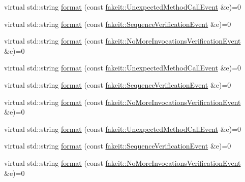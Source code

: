 \begin{DoxyCompactItemize}
\item 
virtual std\+::string \mbox{\hyperlink{structfakeit_1_1EventFormatter_a103815eedb0a69ce7e3565270686bf7b}{format}} (const \mbox{\hyperlink{structfakeit_1_1UnexpectedMethodCallEvent}{fakeit\+::\+Unexpected\+Method\+Call\+Event}} \&e)=0
\item 
virtual std\+::string \mbox{\hyperlink{structfakeit_1_1EventFormatter_a9776a0cb30ddb959b49e1a95ef560946}{format}} (const \mbox{\hyperlink{structfakeit_1_1SequenceVerificationEvent}{fakeit\+::\+Sequence\+Verification\+Event}} \&e)=0
\item 
virtual std\+::string \mbox{\hyperlink{structfakeit_1_1EventFormatter_a2c620c0b788a1c14e8f5ac40dd57d7ad}{format}} (const \mbox{\hyperlink{structfakeit_1_1NoMoreInvocationsVerificationEvent}{fakeit\+::\+No\+More\+Invocations\+Verification\+Event}} \&e)=0
\item 
virtual std\+::string \mbox{\hyperlink{structfakeit_1_1EventFormatter_a103815eedb0a69ce7e3565270686bf7b}{format}} (const \mbox{\hyperlink{structfakeit_1_1UnexpectedMethodCallEvent}{fakeit\+::\+Unexpected\+Method\+Call\+Event}} \&e)=0
\item 
virtual std\+::string \mbox{\hyperlink{structfakeit_1_1EventFormatter_a9776a0cb30ddb959b49e1a95ef560946}{format}} (const \mbox{\hyperlink{structfakeit_1_1SequenceVerificationEvent}{fakeit\+::\+Sequence\+Verification\+Event}} \&e)=0
\item 
virtual std\+::string \mbox{\hyperlink{structfakeit_1_1EventFormatter_a2c620c0b788a1c14e8f5ac40dd57d7ad}{format}} (const \mbox{\hyperlink{structfakeit_1_1NoMoreInvocationsVerificationEvent}{fakeit\+::\+No\+More\+Invocations\+Verification\+Event}} \&e)=0
\item 
virtual std\+::string \mbox{\hyperlink{structfakeit_1_1EventFormatter_a103815eedb0a69ce7e3565270686bf7b}{format}} (const \mbox{\hyperlink{structfakeit_1_1UnexpectedMethodCallEvent}{fakeit\+::\+Unexpected\+Method\+Call\+Event}} \&e)=0
\item 
virtual std\+::string \mbox{\hyperlink{structfakeit_1_1EventFormatter_a9776a0cb30ddb959b49e1a95ef560946}{format}} (const \mbox{\hyperlink{structfakeit_1_1SequenceVerificationEvent}{fakeit\+::\+Sequence\+Verification\+Event}} \&e)=0
\item 
virtual std\+::string \mbox{\hyperlink{structfakeit_1_1EventFormatter_a2c620c0b788a1c14e8f5ac40dd57d7ad}{format}} (const \mbox{\hyperlink{structfakeit_1_1NoMoreInvocationsVerificationEvent}{fakeit\+::\+No\+More\+Invocations\+Verification\+Event}} \&e)=0
\item 

\end{DoxyCompactItemize}
